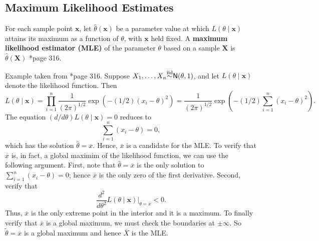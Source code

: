 \subsection*{Maximum Likelihood Estimates}

\begin{defe} \label{defe: mle}
    For each sample point $\bm{x}$, let $\hat{\theta} (\bm{x})$ be a parameter value at which $L(\theta \mid \bm{x})$ attains its maximum as a function of $\theta$, with $\bm{x}$ held fixed. A {\bf maximum likelihood estimator (MLE)} of the parameter $\theta$ based on a sample $\bm{X}$ is $\hat{\theta} (\bm{X})$ \cite{CasellaGeorge2001SI}*{page 316}.
\end{defe}

\begin{exam} \label{exam: normal_mle}
    Example taken from \cite{CasellaGeorge2001SI}*{page 316}. Suppose $X_1, \ldots , X_n {\overset{\text{iid}}{\sim}} {\sf N} (\theta , 1)$, and let $L(\theta \mid \bm{x})$ denote the likelihood function. Then
    \begin{equation*}
        L(\theta \mid \bm{x}) = \prod_{i=1}^{n} \frac{1}{(2 \pi)^{1/2}} \exp \left( -(1/2) (x_i - \theta)^2 \right) = \frac{1}{(2 \pi)^{1/2}} \exp \left( -(1/2) \sum_{i=1}^{n} (x_i - \theta)^2 \right).
    \end{equation*}
    The equation $(d / d\theta) L(\theta \mid \bm{x}) = 0$ reduces to
    \begin{equation*}
        \sum_{i=1}^{n} (x_i - \theta) = 0,
    \end{equation*}
    which has the solution $\hat{\theta} = \overline{x}$. Hence, $\overline{x}$ is a candidate for the MLE. To verify that $\overline{x}$ is, in fact, a global maximim of the likelihood function, we can use the following argument. First, note that $\hat{\theta} = \overline{x}$ is the only solution to $\sum_{i=1}^{n} (x_i - \theta) = 0$; hence $\overline{x}$ is the only zero of the first derivative. Second, verify that
    \begin{equation*}
        \frac{d^2}{d \theta^2} \left. L(\theta \mid \bm{x}) \right|_{\theta = \overline{x}} < 0.
    \end{equation*}
    Thus, $\overline{x}$ is the only extreme point in the interior and it is a maximum. To finally verify that $\overline{x}$ is a global maximum, we must check the boundaries at $\pm \infty$. So $\tilde{\theta} = \overline{x}$ is a global maximum and hence $\overline{X}$ is the MLE.
\end{exam}

